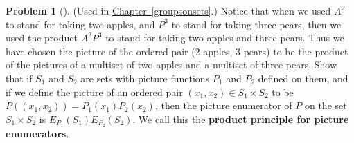 \documentclass[10pt,]{book}
\newcommand{\terminology}[1]{\textbf{#1}}
\theoremstyle{plain}
\theoremstyle{definition}
\newtheorem{activity}[project]{Problem}
\theoremstyle{definition}
\numberwithin{equation}{chapter}
\begin{document}
\begin{activity}[] \label{activity-182}
(Used in \hyperref[groupsonsets]{Chapter~\ref{groupsonsets}}.) Notice that when we used \(A^2\) to stand for taking two apples, and \(P^3\) to stand for taking three pears, then we used the product \(A^2P^3\) to stand for taking two apples and three pears. Thus we have chosen the picture of the ordered pair (2 apples, 3 pears) to be the product of the pictures of a multiset of two apples and a multiset of three pears. Show that if \(S_1\) and \(S_2\) are sets with picture functions \(P_1\) and \(P_2\) defined on them, and if we define the picture of an ordered pair \((x_1,x_2)\in S_1\times S_2\) to be \(P((x_1,x_2))= P_1(x_1)P_2(x_2)\), then the picture enumerator of \(P\) on the set \(S_1\times S_2\) is \(E_{P_1}(S_1)E_{P_2}(S_2)\). We call this the \terminology{product principle for picture enumerators}.%
\end{activity}
\typeout{************************************************}
\typeout{************************************************}
\end{document}
